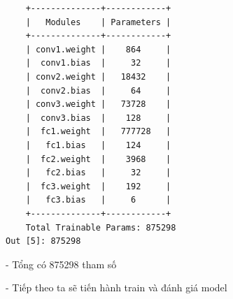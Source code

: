 \documentclass[12pt, a4paper]{article}
\begin{document}
\begin{verbatim}
    +--------------+------------+
    |   Modules    | Parameters |
    +--------------+------------+
    | conv1.weight |    864     |
    |  conv1.bias  |     32     |
    | conv2.weight |   18432    |
    |  conv2.bias  |     64     |
    | conv3.weight |   73728    |
    |  conv3.bias  |    128     |
    |  fc1.weight  |   777728   |
    |   fc1.bias   |    124     |
    |  fc2.weight  |    3968    |
    |   fc2.bias   |     32     |
    |  fc3.weight  |    192     |
    |   fc3.bias   |     6      |
    +--------------+------------+
    Total Trainable Params: 875298
Out [5]: 875298
\end{verbatim}
\par - Tổng có 875298 tham số
\vspace{0.5cm}
\par - Tiếp theo ta sẽ tiến hành train và đánh giá model
\newpage
\end{document}
